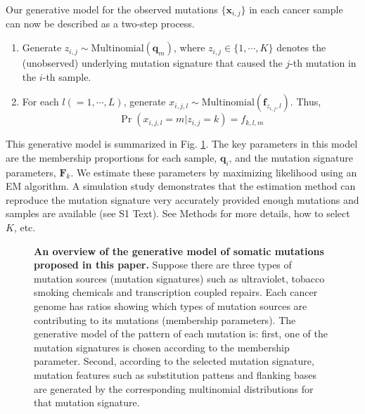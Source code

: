 \documentclass[10pt,letterpaper]{article}
\begin{document}
Our generative model for the observed mutations $\{ \bm{x}_{i,j} \}$ in each
cancer sample can now be described as a two-step process.
\begin{enumerate}
\item
Generate $z_{i,j} \sim \text{Multinomial} (\bm{q}_m)$, where $z_{i,j} \in \{1,\cdots,K \}$ denotes the (unobserved) underlying mutation signature that caused the $j$-th mutation in the $i$-th sample.
\item 
For each $l (= 1, \cdots, L)$, generate $x_{i,j,l} \sim \text{Multinomial}(\bm{f}_{z_{i,j},l})$.
Thus, 
\begin{equation}
\Pr(x_{i,j,l} = m | z_{i,j}=k) = f_{k,l,m} 
\end{equation}
\end{enumerate}

This generative model is summarized in Fig. \ref{methodOverview}.
The key parameters in this model
are the membership proportions for each sample, $\bm{q}_i$, and the mutation signature parameters, $\bm{F}_k$. 
We estimate these parameters by maximizing likelihood using an EM algorithm. 
A simulation study demonstrates that the estimation method can reproduce the mutation signature very accurately 
provided enough mutations and samples are available (see S1 Text). 
See Methods for more details, how to select $K$, etc.


\begin{figure}[h]
\caption{{\bf An overview of the generative model of somatic mutations proposed in this paper.} 
Suppose there are three types of mutation sources (mutation signatures) such as ultraviolet, tobacco smoking chemicals and transcription coupled repairs.
Each cancer genome has ratios showing which types of mutation sources are contributing to its mutations (membership parameters).
The generative model of the pattern of each mutation is:
first, one of the mutation signatures is chosen according to the membership parameter.
Second, according to the selected mutation signature, mutation features such as substitution pattens and flanking bases are generated 
by the corresponding multinomial distributions for that mutation signature.
}
\label{methodOverview}
\end{figure}
\end{document}
